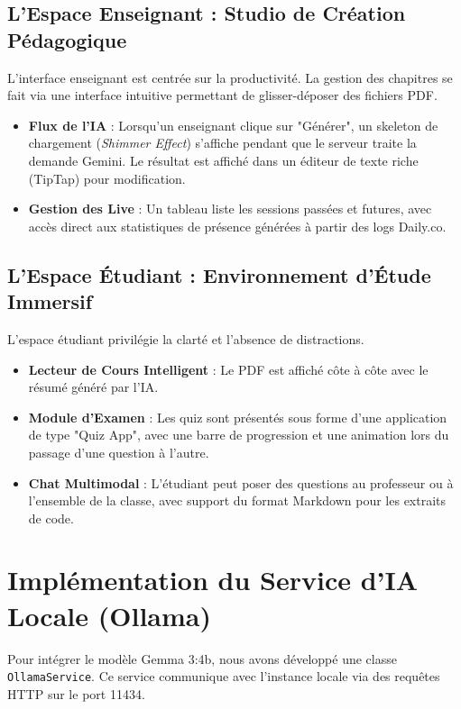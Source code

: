 \subsection{L'Espace Enseignant : Studio de Création Pédagogique}
L'interface enseignant est centrée sur la productivité. La gestion des chapitres se fait via une interface intuitive permettant de glisser-déposer des fichiers PDF.
\begin{itemize}
    \item \textbf{Flux de l'IA} : Lorsqu'un enseignant clique sur "Générer", un skeleton de chargement (\textit{Shimmer Effect}) s'affiche pendant que le serveur traite la demande Gemini. Le résultat est affiché dans un éditeur de texte riche (TipTap) pour modification.
    \item \textbf{Gestion des Live} : Un tableau liste les sessions passées et futures, avec accès direct aux statistiques de présence générées à partir des logs Daily.co.
\end{itemize}

\subsection{L'Espace Étudiant : Environnement d'Étude Immersif}
L'espace étudiant privilégie la clarté et l'absence de distractions.
\begin{itemize}
    \item \textbf{Lecteur de Cours Intelligent} : Le PDF est affiché côte à côte avec le résumé généré par l'IA.
    \item \textbf{Module d'Examen} : Les quiz sont présentés sous forme d'une application de type "Quiz App", avec une barre de progression et une animation lors du passage d'une question à l'autre.
    \item \textbf{Chat Multimodal} : L'étudiant peut poser des questions au professeur ou à l'ensemble de la classe, avec support du format Markdown pour les extraits de code.
\end{itemize}

\section{Implémentation du Service d'IA Locale (Ollama)}
Pour intégrer le modèle Gemma 3:4b, nous avons développé une classe \texttt{OllamaService}. Ce service communique avec l'instance locale via des requêtes HTTP sur le port 11434.

